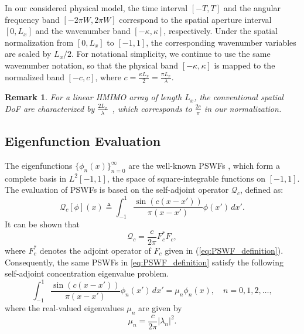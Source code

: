 \documentclass[lettersize,journal]{IEEEtran}
\theoremstyle{plain}
\newtheorem{remark}{Remark}
\begin{document}
In our considered physical model, the time interval $[-T, T]$ and the angular frequency band $[-2\pi W, 2\pi W]$ correspond to the spatial aperture interval $[0, L_x]$ and the wavenumber band $[-\kappa, \kappa]$, respectively. 
Under the spatial normalization from $[0, L_x]$ to $[-1, 1]$, the corresponding wavenumber variables are scaled by $L_x/2$. For notational simplicity, we continue to use the same wavenumber notation, so that the physical band $[-\kappa, \kappa]$ is mapped to the normalized band $[-c, c]$, where $c=\frac{\kappa L_x}{2}
=\frac{\pi L_x}{\lambda}$.
\begin{remark}
	For a linear HMIMO array of length $L_x$, the conventional spatial DoF are characterized by $\frac{2L_x}{\lambda}$~\cite{pizzo2020degrees}, which corresponds to $\frac{2c}{\pi}$ in our normalization. 
\end{remark}

\subsection{Eigenfunction Evaluation}
\label{sec:eigenfunction_computation}
The eigenfunctions $\{\phi_n(x)\}_{n=0}^{\infty}$ are the well-known PSWFs \cite{Slepian1961Prolate}, which form a complete basis in $L^2[-1, 1]$, the space of square-integrable functions on $[-1, 1]$. The evaluation of PSWFs is based on the self-adjoint operator $\mathcal{Q}_c$, defined as:
\begin{equation}
	\mathcal{Q}_c[\phi](x) \triangleq \int_{-1}^{1}\frac{\sin(c(x-x'))}{\pi(x-x')}\phi(x')\,dx'.
	\label{eq:operator_Q}
\end{equation} 
It can be shown that
$$
	\mathcal{Q}_c = \frac{c}{2\pi} F_c^* F_c,
$$
where $F_c^*$ denotes the adjoint operator of $F_c$ given in (\ref{eq:PSWF_definition}).
Consequently, the same PSWFs in \eqref{eq:PSWF_definition} satisfy the following self-adjoint concentration eigenvalue problem.
$$
	\int_{-1}^{1}\frac{\sin(c(x-x'))}{\pi(x-x')}\phi_n(x')\,dx' = \mu_n \phi_n(x), \quad
	n = 0, 1, 2, \ldots,
	\label{eq:PSWF_integral}
$$
where the real-valued eigenvalues $\mu_n$ are given by
\begin{equation}
	\mu_n = \frac{c}{2\pi}|\lambda_n|^2.
	\label{eq:mu_n_definition}
\end{equation}
	
\end{document}
